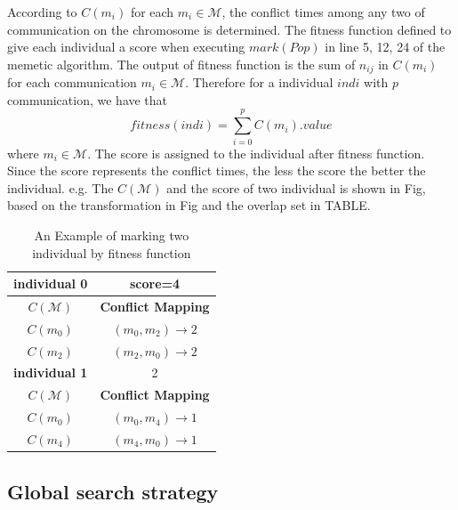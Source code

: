\documentclass[journal]{IEEEtran}
\begin{document}
According to $C(m_{i})$ for each $m_{i}\in\mathcal{M}$, the conflict times among any two of communication on the chromosome is determined. The fitness function defined to give each individual a score when executing $mark(Pop)$ in line 5, 12, 24 of the memetic algorithm. The output of fitness function is the sum of $n_{ij}$ in $C(m_{i})$ for each communication $m_{i}\in\mathcal{M}$. Therefore for a individual $indi$ with $p$ communication, we have that
\begin{equation}
	fitness(indi)=\sum_{i=0}^p {C(m_i).value}
\end{equation}
where $m_i\in\mathcal{M}$. The score is assigned to the individual after fitness function. Since the score represents the conflict times, the less the score the better the individual. e.g. The $C(\mathcal{M})$ and the score of two individual is shown in Fig, based on the transformation in Fig and the overlap set in TABLE. 

\begin{table}[!t]
	\renewcommand{\arraystretch}{1.3}
	\caption{An Example of marking two individual by fitness function}
	\label{t:fitness}
	\centering
	\begin{tabular}{|c||c|}
		\hline
		\textbf{individual 0} & score=4\\
		\hline
		\textbf{$C(\mathcal{M})$} &\textbf{Conflict Mapping} \\
		\hline 
		$C(m_{0})$ & $ (m_0,m_2)\rightarrow 2$ \\
		\cline{1-2}  
		$C(m_{2})$ & $ (m_2,m_0)\rightarrow 2$ \\
		\hline
			\hline
			\textbf{individual 1} & 2\\
 			\hline
			\textbf{$C(\mathcal{M})$} & \textbf{Conflict Mapping}  \\
			\hline 
			$C(m_{0})$ & $ (m_0,m_4)\rightarrow 1$ \\
			\hline  
			$C(m_{4})$ & $ (m_4,m_0)\rightarrow 1$	 \\
			\hline	
	\end{tabular}	

\end{table}

\subsection{Global search strategy}
\end{document}
